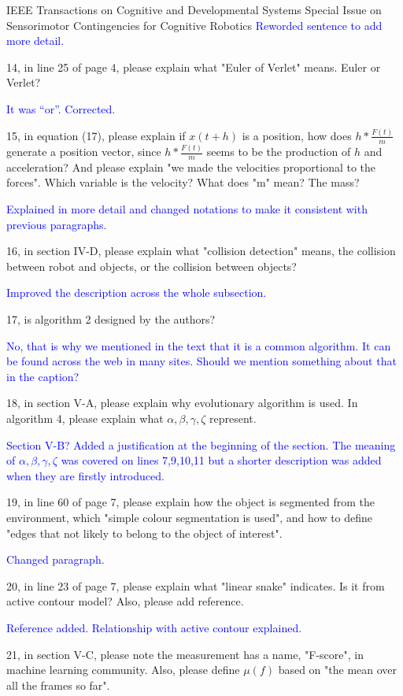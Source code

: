 \documentclass[a4paper,12pt]{letter}
\newcommand{\comment}[1]{\textcolor{blue}{#1}}
\begin{document}
\begin{letter}{IEEE Transactions on Cognitive and Developmental Systems\newline
Special Issue on Sensorimotor Contingencies for Cognitive Robotics}
\comment{Reworded sentence to add more detail.}

14, in line 25 of page 4, please explain what "Euler of Verlet" means. Euler or Verlet? 

\comment{It was ``or''.  Corrected.}

15, in equation (17), please explain if $x(t+h)$ is a position, how does $h*\frac{F(t)}{m}$ generate a position vector, since $h*\frac{F(t)}{m}$ seems to be the production of $h$ and acceleration? And please explain "we made the velocities proportional to the forces". Which variable is the velocity? What does "m" mean? The mass?

\comment{Explained in more detail and changed notations to make it consistent with previous paragraphs.}

16, in section IV-D, please explain what "collision detection" means, the collision between robot and objects, or the collision between objects?

\comment{Improved the description across the whole subsection.}

17, is algorithm 2 designed by the authors?

\comment{No, that is why we mentioned in the text that it is a common algorithm.  It can be found across the web in many sites.  Should we mention something about that in the caption?}

18, in section V-A, please explain why evolutionary algorithm is used. In algorithm 4, please explain what $\alpha, \beta, \gamma, \zeta$ represent.

\comment{Section V-B? Added a justification at the beginning of the section.  The meaning of $\alpha, \beta, \gamma, \zeta$ was covered on lines 7,9,10,11 but a shorter description was added when they are firstly introduced.}

19, in line 60 of page 7, please explain how the object is segmented from the environment, which "simple colour segmentation is used", and how to define "edges that not likely to belong to the object of interest".

\comment{Changed paragraph.}

20, in line 23 of page 7, please explain what "linear snake" indicates. Is it from active contour model? Also, please add reference. 

\comment{Reference added.  Relationship with active contour explained.}

21, in section V-C, please note the measurement has a name, "F-score", in machine learning community. Also, please define $\mu(f)$ based on "the mean over all the frames so far".


\end{letter}
\end{document}
